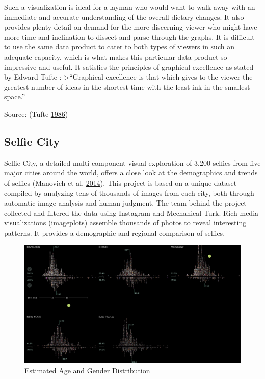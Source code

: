 \documentclass[]{book}
\begin{document}
Such a visualization is ideal for a layman who would want to walk away with an immediate and accurate understanding of the overall dietary changes. It also provides plenty detail on demand for the more discerning viewer who might have more time and inclination to dissect and parse through the graphs. It is difficult to use the same data product to cater to both types of viewers in such an adequate capacity, which is what makes this particular data product so impressive and useful. It satisfies the principles of graphical excellence as stated by Edward Tufte :
\textgreater{}``Graphical excellence is that which gives to the viewer the greatest number of ideas in the shortest time with the least ink in the smallest space.''

Source: (Tufte \protect\hyperlink{ref-The-Visual-Display-of-Quantitative-Information}{1986})

\hypertarget{selfie-city}{%
\subsection{Selfie City}\label{selfie-city}}

Selfie City, a detailed multi-component visual exploration of 3,200 selfies from five major cities around the world, offers a close look at the demographics and trends of selfies (Manovich et al. \protect\hyperlink{ref-selfie}{2014}). This project is based on a unique dataset compiled by analyzing tens of thousands of images from each city, both through automatic image analysis and human judgment. The team behind the project collected and filtered the data using Instagram and Mechanical Turk. Rich media visualizations (imageplots) assemble thousands of photos to reveal interesting patterns. It provides a demographic and regional comparison of selfies.

\begin{figure}
\centering
\includegraphics{images/selfie_age_gender.png}
\caption{Estimated Age and Gender Distribution}
\end{figure}
\end{document}
